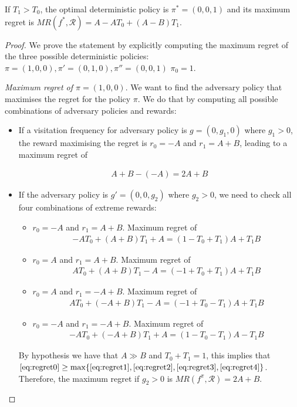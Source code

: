 \begin{proposition}\label{theorem:opt_det}
If $T_1 > T_0$, the optimal deterministic policy is $\pi^* = (0, 0, 1)$ and its maximum regret is $MR(f^*, \mathcal{R}) = A- A T_0 +(A-B) T_1$. 
\end{proposition}
\begin{proof}
We prove the statement by explicitly computing the maximum regret of the three possible deterministic policies:$\pi = (1, 0, 0), \pi' =(0, 1, 0), \pi''= (0, 0, 1)$ $\pi_0=1$.

\textit{Maximum regret of $\pi = (1, 0, 0)$}. We want to find the adversary policy that maximises the regret for the policy $\pi$. We do that by computing all possible combinations of adversary policies and rewards:
\begin{itemize}
\item If a visitation frequency for adversary policy is $g = (0, g_1, 0)$ where $g_1> 0$, the reward maximising the regret is $r_0 = -A$ and $r_1 = A+B$, leading to a maximum regret of 

\begin{align}
A+B-(-A)=2A+B \label{eq:regret0}
\end{align}
\item If the adversary policy is $g' = (0, 0, g_2)$ where $g_2>0$, we need to check all four combinations of extreme rewards:
\begin{itemize}
\item $r_0 = -A$ and $r_1= A+B$. Maximum regret of
\begin{align}
-A T_0 + (A+B)T_1 + A = (1-T_0 + T_1)A + T_1 B \label{eq:regret1}
\end{align}
\item $r_0 = A$ and $r_1= A+B$. Maximum regret of
\begin{align}
A T_0 + (A+B)T_1 - A = (-1+T_0 + T_1)A + T_1 B  \label{eq:regret2}
\end{align}
\item $r_0 = A$ and $r_1= -A+B$. Maximum regret of
\begin{align} 
A T_0 + (-A+B)T_1 - A =  (-1+T_0 - T_1)A + T_1 B \label{eq:regret3}
\end{align}
\item $r_0 = -A$ and $r_1= -A+B$. Maximum regret of
\begin{align}
-A T_0 + (-A+B)T_1 + A =  (1 - T_0 - T_1)A - T_1 B \label{eq:regret4}
\end{align}
\end{itemize} 
By hypothesis we have that $A\gg B$ and $T_0+T_1= 1$, this implies that $\eqref{eq:regret0} \geq \max\{\eqref{eq:regret1}, \eqref{eq:regret2}, \eqref{eq:regret3}, \eqref{eq:regret4} \}$. Therefore, the maximum regret if $g_2>0$ is $MR(f^{\pi}, \mathcal{R}) = 2A+B$.
\end{itemize} 


\end{proof}
